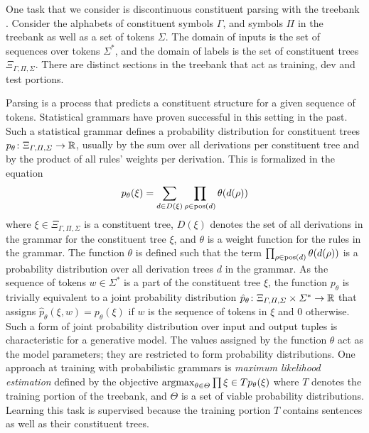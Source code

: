 \documentclass[../document.tex]{subfiles}
\begin{document}
    \begin{example}
        One task that we consider is discontinuous constituent parsing with the \negra{} treebank \citep{Skut98}.
        Consider the alphabets of constituent symbols \(\varGamma\), and  symbols \(\varPi\) in the \negra{} treebank as well as a set of tokens \(\varSigma\).
        The domain of inputs is the set of sequences over tokens \(\varSigma^*\), and the domain of labels is the set of constituent trees \(\Xi_{\varGamma, \varPi, \varSigma}\).
        There are distinct sections in the \negra{} treebank that act as training, dev and test portions.

        Parsing is a process that predicts a constituent structure for a given sequence of tokens.
        Statistical grammars have proven successful in this setting in the past.
        Such a statistical grammar defines a probability distribution for constituent trees \(p_{\theta}\colon \Xi_{\varGamma, \varPi, \varSigma} \to \mathbb{R}\), usually by the sum over all derivations per constituent tree and by the product of all rules' weights per derivation.
        This is formalized in the equation \[
        p_{\theta}(\xi) = \sum_{d \in D(\xi)} \prod_{\rho \in \operatorname{pos}(d)} \theta(d(\rho))
        \]
        where \(\xi \in \Xi_{\varGamma, \varPi, \varSigma}\) is a constituent tree, \(D(\xi)\) denotes the set of all derivations in the grammar for the constituent tree \(\xi\), and \(\theta\) is a weight function for the rules in the grammar.
        The function \(\theta\) is defined such that the term \(\prod_{\rho \in \operatorname{pos}(d)} \theta(d(\rho))\) is a probability distribution over all derivation trees \(d\) in the grammar.
        As the sequence of tokens \(w \in \varSigma^*\) is a part of the constituent tree \(\xi\), the function \(p_{\theta}\) is trivially equivalent to a joint probability distribution \(\hat{p}_\theta\colon \Xi_{\varGamma, \varPi, \varSigma} \times \varSigma^* \to \mathbb{R}\) that assigns \(\hat{p}_\theta(\xi, w) = p_\theta(\xi)\) if \(w\) is the sequence of tokens in \(\xi\) and \(0\) otherwise.
        Such a form of joint probability distribution over input and output tuples is characteristic for a generative model.
        The values assigned by the function \(\theta\) act as the model parameters; they are restricted to form probability distributions.
        One approach at training with probabilistic grammars is \emph{maximum likelihood estimation} defined by the objective \(\operatorname{arg max}_{\theta \in \varTheta} \prod{\xi \in T} p_{\theta}(\xi)\) where \(T\) denotes the training portion of the treebank, and \(\varTheta\) is a set of viable probability distributions.
        Learning this task is supervised because the training portion \(T\) contains sentences as well as their constituent trees.
    \end{example}
\end{document}
